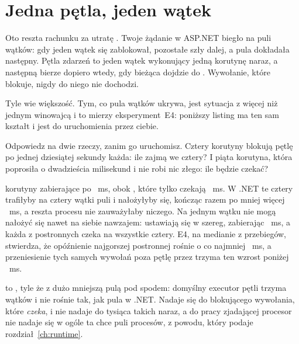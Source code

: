 \section{Jedna pętla, jeden wątek}
\label{sec:asyncio-one-thread}

Oto reszta rachunku za utratę . Twoje żądanie
w ASP.NET biegło na puli wątków: gdy jeden wątek się zablokował, pozostałe
szły dalej, a pula dokładała następny. Pętla zdarzeń to jeden wątek
wykonujący jedną korutynę naraz, a następną bierze dopiero wtedy, gdy
bieżąca dojdzie do . Wywołanie, które blokuje, nigdy do niego
nie dochodzi.

Tyle wie większość. Tym, co pula wątków ukrywa, jest sytuacja z więcej niż
jednym winowajcą \dash{} i to mierzy eksperyment~E4: poniższy listing ma
ten sam kształt i jest do uruchomienia przez ciebie.


\noindent
Odpowiedz na dwie rzeczy, zanim go uruchomisz. Cztery korutyny blokują
pętlę po jednej dziesiątej sekundy każda: ile zajmą we cztery? I piąta
korutyna, która poprosiła o dwadzieścia milisekund i nie robi nic złego:
ile będzie czekać?

 korutyny zabierające po ~ms, obok
, które tylko czekają ~ms. W .NET te
cztery trafiłyby na cztery wątki puli i nałożyłyby się, kończąc razem po
mniej więcej ~ms, a reszta procesu nie zauważyłaby
niczego. Na jednym wątku nie mogą nałożyć się nawet na siebie nawzajem:
ustawiają się w szereg, zabierając ~ms, a każda z
 postronnych czeka na wszystkie cztery. E4, na medianie z
 przebiegów, stwierdza, że opóźnienie najgorszej postronnej
rośnie o co najmniej
~ms, a przeniesienie tych samych wywołań poza pętlę
przez  trzyma ten wzrost poniżej
~ms.


\begin{csbox}
 to , tyle że z dużo mniejszą pulą pod
spodem: domyślny executor pętli trzyma 
wątków i nie rośnie tak, jak pula w .NET. Nadaje się do blokującego
wywołania, które \emph{czeka}, i nie nadaje do tysiąca takich naraz, a do
pracy zjadającej procesor nie nadaje się w ogóle \dash{} ta chce puli
procesów, z powodu, który podaje rozdział~\ref{ch:runtime}.
\end{csbox}

